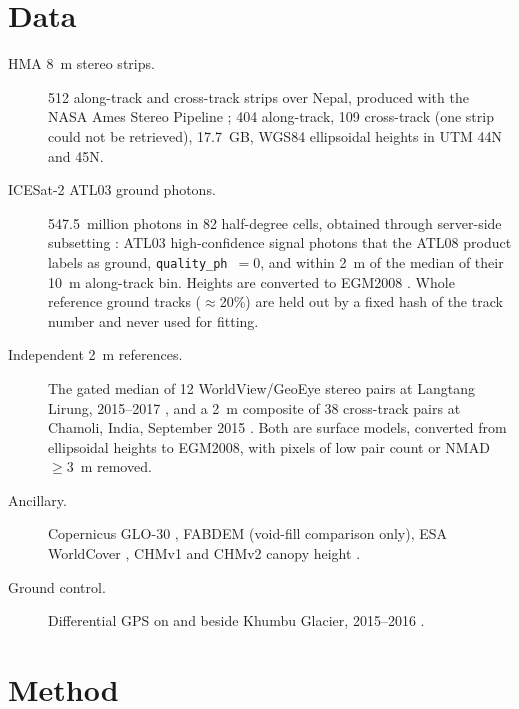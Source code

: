 \documentclass[11pt]{article}
\begin{document}
\section{Data}
\begin{description}
\item[HMA 8~m stereo strips.] 512 along-track \citep{shean2017hmaat} and cross-track \citep{shean2017hmact} strips
over Nepal, produced with the NASA Ames Stereo Pipeline \citep{shean2016asp,shean2020hma}; 404 along-track, 109 cross-track (one strip could not be
retrieved), 17.7~GB, WGS84 ellipsoidal heights in UTM 44N and 45N.
\item[ICESat-2 ATL03 ground photons.] 547.5~million photons in 82 half-degree cells, obtained through server-side
subsetting \citep{sliderule}: ATL03 high-confidence signal photons \citep{neumann2019atl03} that the ATL08 product
\citep{neuenschwander2019atl08} labels as ground, \texttt{quality\_ph}~$=0$, and within 2~m of the median of their
10~m along-track bin. Heights are converted to EGM2008 \citep{pavlis2012egm2008}. Whole reference ground tracks
($\approx$20\%) are held out by a fixed hash of the track number and never used for fitting.
\item[Independent 2~m references.] The gated median of 12 WorldView/GeoEye stereo pairs at Langtang Lirung,
2015--2017 \citep{shean2026langtang}, and a 2~m composite of 38 cross-track pairs at Chamoli, India, September 2015
\citep{bhushan2021chamoli}. Both are surface models, converted from ellipsoidal heights to EGM2008, with pixels
of low pair count or NMAD $\geq 3$~m removed.
\item[Ancillary.] Copernicus GLO-30 \citep{esa2021copernicus}, FABDEM \citep{hawker2022fabdem} (void-fill
comparison only), ESA WorldCover \citep{zanaga2022worldcover},
CHMv1 \citep{tolan2024canopy} and CHMv2 canopy height \citep{brandt2026chmv2}.
\item[Ground control.] Differential GPS on and beside Khumbu Glacier, 2015--2016 \citep{quincey2016khumbu}.
\end{description}

\section{Method}
\end{document}

